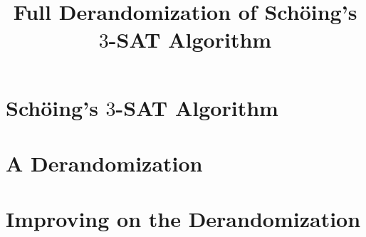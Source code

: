 \documentclass{article}
\title{Full Derandomization of Sch\"{o}ing's $3$-SAT Algorithm}
\author{}
\date{}
\begin{document}
\maketitle

\section{Sch\"{o}ing's $3$-SAT Algorithm}

\section{A Derandomization}

\section{Improving on the Derandomization}
\end{document}
